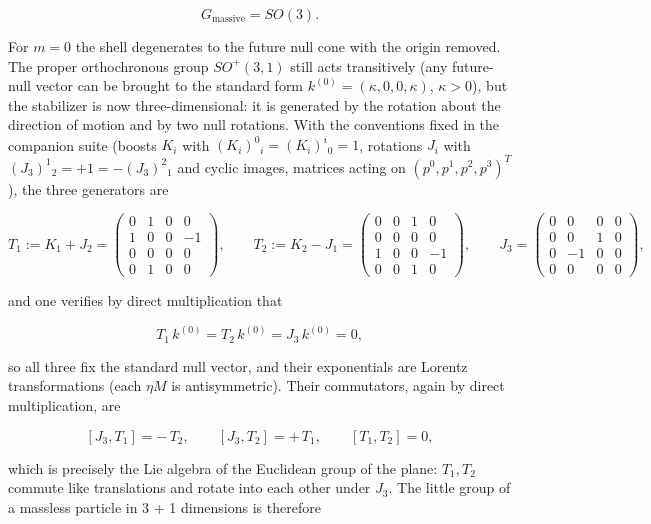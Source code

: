 \documentclass[
]{article}
\begin{document}
\[G_{\mathrm{massive}} = SO(3). \tag{64}\]

For \(m = 0\) the shell degenerates to the future null cone with the
origin removed. The proper orthochronous group \(SO^{+}(3, 1)\) still
acts transitively (any future-null vector can be brought to the standard
form \(k^{(0)} = (\kappa, 0, 0, \kappa)\), \(\kappa > 0\)), but the
stabilizer is now three-dimensional: it is generated by the rotation
about the direction of motion and by two null rotations. With the
conventions fixed in the companion suite (boosts \(K_{i}\) with
\((K_{i})^{0}{}_{i} = (K_{i})^{i}{}_{0} = 1\), rotations \(J_{i}\) with
\((J_{3})^{1}{}_{2} = +1 = -(J_{3})^{2}{}_{1}\) and cyclic images,
matrices acting on \((p^{0}, p^{1}, p^{2}, p^{3})^{T}\)), the three
generators are

\[T_{1} := K_{1} + J_{2} = \begin{pmatrix} 0 & 1 & 0 & 0 \\ 1 & 0 & 0 & -1 \\ 0 & 0 & 0 & 0 \\ 0 & 1 & 0 & 0 \end{pmatrix}, \qquad
T_{2} := K_{2} - J_{1} = \begin{pmatrix} 0 & 0 & 1 & 0 \\ 0 & 0 & 0 & 0 \\ 1 & 0 & 0 & -1 \\ 0 & 0 & 1 & 0 \end{pmatrix}, \qquad
J_{3} = \begin{pmatrix} 0 & 0 & 0 & 0 \\ 0 & 0 & 1 & 0 \\ 0 & -1 & 0 & 0 \\ 0 & 0 & 0 & 0 \end{pmatrix}, \tag{65}\]

and one verifies by direct multiplication that

\[T_{1}\, k^{(0)} = T_{2}\, k^{(0)} = J_{3}\, k^{(0)} = 0, \tag{66}\]

so all three fix the standard null vector, and their exponentials are
Lorentz transformations (each \(\eta M\) is antisymmetric). Their
commutators, again by direct multiplication, are

\[[J_{3}, T_{1}] = -\, T_{2}, \qquad [J_{3}, T_{2}] = +\, T_{1}, \qquad [T_{1}, T_{2}] = 0, \tag{67}\]

which is precisely the Lie algebra of the Euclidean group of the plane:
\(T_{1}, T_{2}\) commute like translations and rotate into each other
under \(J_{3}\). The little group of a massless particle in 3 + 1
dimensions is therefore
\end{document}
